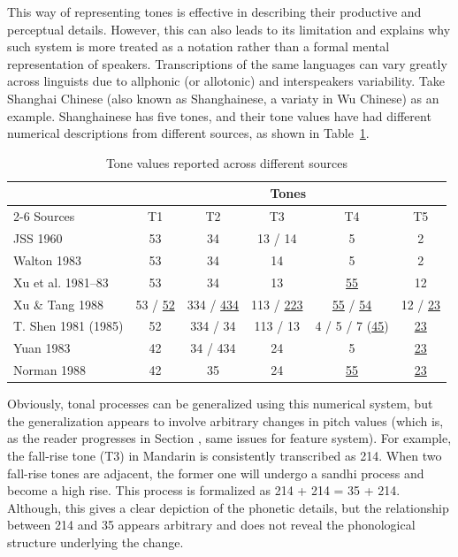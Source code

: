 This way of representing tones is effective in describing their productive
and perceptual details. However, this can also leads to its limitation
and explains why such system is more treated as a notation rather than a formal mental representation of speakers. Transcriptions of the same languages can vary greatly across
linguists due to allphonic (or allotonic) and interspeakers variability. 
Take Shanghai Chinese (also known as Shanghainese, a variaty in Wu Chinese) as an example. Shanghainese has five tones, and their tone values have had different numerical
descriptions from different sources, as shown in Table~\ref{tab:shanghai-tones}.

\begin{table}[ht]
\centering
\caption{Tone values reported across different sources}
\label{tab:shanghai-tones}
\begin{tabular}{lccccc}
\toprule
& \multicolumn{5}{c}{Tones} \\
\cmidrule(lr){2-6}
Sources & T1 & T2 & T3 & T4 & T5 \\
\midrule
JSS 1960          & 53              & 34               & 13 / 14           & 5                & 2               \\
Walton 1983       & 53              & 34               & 14                & 5                & 2               \\
Xu et al. 1981--83 & 53             & 34               & 13                & \underline{55}   & 12              \\
Xu \& Tang 1988   & 53 / \underline{52}
                  & 334 / \underline{434}
                  & 113 / \underline{223}
                  & \underline{55} / \underline{54}
                  & 12 / \underline{23} \\
T. Shen 1981 (1985)
                  & 52
                  & 334 / 34
                  & 113 / 13
                  & 4 / 5 / 7 (\underline{45})
                  & \underline{23} \\
Yuan 1983         & 42              & 34 / 434         & 24                & 5                & \underline{23}  \\
Norman 1988       & 42              & 35               & 24                & \underline{55}   & \underline{23}  \\
\bottomrule
\end{tabular}
\end{table}

Obviously, tonal processes can be generalized using this numerical system, but 
the generalization appears to involve arbitrary changes in pitch values (which is, 
as the reader progresses in Section , same issues for feature system). For example, the fall-rise tone (T3) in Mandarin is consistently transcribed as 214. 
When two fall-rise tones are adjacent, the former one will undergo a sandhi process
and become a high rise. This process is formalized as 214 + 214 = 35 + 214. 
Although, this gives a clear depiction of the phonetic details, but the relationship 
between 214 and 35 appears arbitrary and does not reveal the phonological structure 
underlying the change. 

